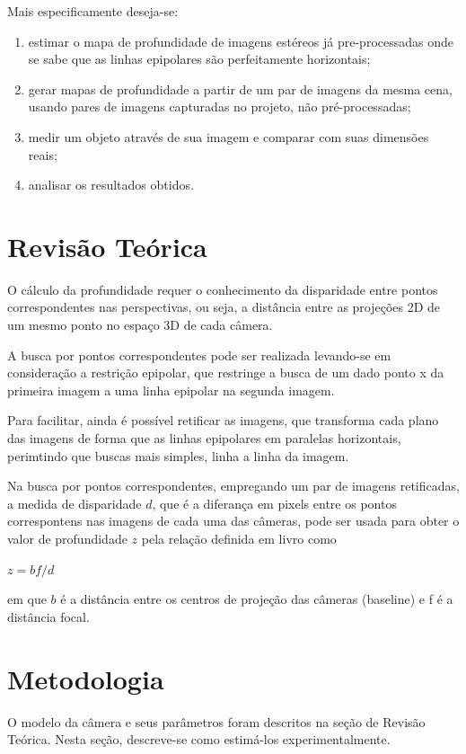 \documentclass[conference]{IEEEtran}
\begin{document}
Mais especificamente deseja-se:
\begin{enumerate}
\item estimar o mapa de profundidade de imagens estéreos já pre-processadas onde se sabe que as linhas epipolares são perfeitamente horizontais;
\item gerar mapas de profundidade a partir de um par de imagens da mesma cena, usando pares de imagens capturadas no projeto, não pré-processadas;
\item medir um objeto através de sua imagem e comparar com suas dimensões reais;
\item analisar os resultados obtidos.
\end{enumerate}
\section{Revisão Teórica}

O cálculo da profundidade requer o conhecimento da disparidade entre pontos correspondentes nas perspectivas, ou seja, a distância entre as projeções 2D de um mesmo ponto no espaço 3D de cada câmera.

A busca por pontos correspondentes pode ser realizada levando-se em consideração a restrição epipolar, que restringe a busca de um dado ponto x da primeira imagem a uma linha epipolar na segunda imagem.

Para facilitar, ainda é possível retificar as imagens, que transforma cada plano das imagens de forma que as linhas epipolares em paralelas horizontais, perimtindo que buscas mais simples, linha a linha da imagem.

Na busca por pontos correspondentes, empregando um par de imagens retificadas, a medida de disparidade \(d\), que é a diferança em pixels entre os pontos correspontens nas imagens de cada uma das câmeras, pode ser usada para obter o valor de profundidade \(z\) pela relação definida em {livro} como

\(z = b f /d \)

em que \(b\) é a distância entre os centros de projeção das câmeras (baseline) e f é a distância focal. 
\section{Metodologia}\label{metodologia}
O modelo da câmera e seus parâmetros foram descritos na seção de Revisão Teórica. Nesta seção, descreve-se como estimá-los experimentalmente.
\end{document}
